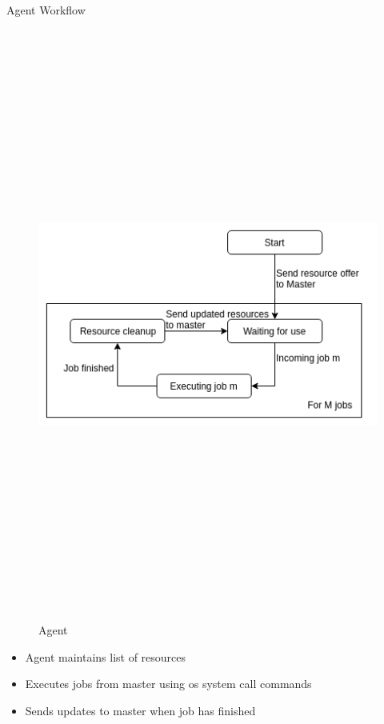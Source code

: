 \documentclass[unknownkeysallowed, final]{beamer}
\begin{document}
\begin{frame}
\begin{columns}[t]
\begin{column}{.33\linewidth}
\begin{block}{Agent Workflow}
\begin{figure}
		    \centering
		    \includegraphics[height=19.5cm,width=39cm]{agent.png}
		    \caption{Agent}
		    \label{fig:agent}
		\end{figure}
\begin{itemize}
    \item Agent maintains list of resources 
    \item Executes jobs from master using os system call commands
    \item Sends updates to master when job has finished
\end{itemize}
\end{block}

\end{column}
\end{columns}
\end{frame}
\end{document}
